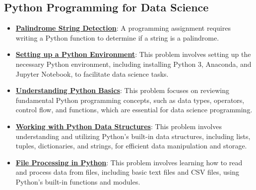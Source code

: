 \documentclass{article}%
\begin{document}
\subsection{Python Programming for Data Science}%
\label{subsec:PythonProgrammingforDataScience}%
\begin{itemize}[leftmargin=*]%
\item \href{https://purdue.brightspace.com/d2l/common/assets/pdfjs-d2l-dist/1.0.14-legacy/web/viewer.html?file=\%2Fcontent\%2Fenforced\%2F1095465-WL.202510.CS24200.LE1\%2F01L1-introduction.pdf\%3Fou\%3D1095465\&lang=en-us\&container=d2l-fileviewer-rendered-pdf\&fullscreen=d2l-fileviewer-rendered-pdf-dialog\&height=667#page=18}{\textbf{Palindrome String Detection}}: A programming assignment requires writing a Python function to determine if a string is a palindrome.%
\item \href{https://purdue.brightspace.com/d2l/common/assets/pdfjs-d2l-dist/1.0.14-legacy/web/viewer.html?file=\%2Fcontent\%2Fenforced\%2F1095465-WL.202510.CS24200.LE1\%2F02L1-python.pdf\%3Fou\%3D1095465\&lang=en-us\&container=d2l-fileviewer-rendered-pdf\&fullscreen=d2l-fileviewer-rendered-pdf-dialog\&height=667#page=3}{\textbf{Setting up a Python Environment}}: This problem involves setting up the necessary Python environment, including installing Python 3, Anaconda, and Jupyter Notebook, to facilitate data science tasks.%
\item \href{https://purdue.brightspace.com/d2l/common/assets/pdfjs-d2l-dist/1.0.14-legacy/web/viewer.html?file=\%2Fcontent\%2Fenforced\%2F1095465-WL.202510.CS24200.LE1\%2F02L1-python.pdf\%3Fou\%3D1095465\&lang=en-us\&container=d2l-fileviewer-rendered-pdf\&fullscreen=d2l-fileviewer-rendered-pdf-dialog\&height=667#page=6}{\textbf{Understanding Python Basics}}: This problem focuses on reviewing fundamental Python programming concepts, such as data types, operators, control flow, and functions, which are essential for data science programming.%
\item \href{https://purdue.brightspace.com/d2l/common/assets/pdfjs-d2l-dist/1.0.14-legacy/web/viewer.html?file=\%2Fcontent\%2Fenforced\%2F1095465-WL.202510.CS24200.LE1\%2F02L1-python.pdf\%3Fou\%3D1095465\&lang=en-us\&container=d2l-fileviewer-rendered-pdf\&fullscreen=d2l-fileviewer-rendered-pdf-dialog\&height=667#page=17}{\textbf{Working with Python Data Structures}}: This problem involves understanding and utilizing Python's built-in data structures, including lists, tuples, dictionaries, and strings, for efficient data manipulation and storage.%
\item \href{https://purdue.brightspace.com/d2l/common/assets/pdfjs-d2l-dist/1.0.14-legacy/web/viewer.html?file=\%2Fcontent\%2Fenforced\%2F1095465-WL.202510.CS24200.LE1\%2F02L1-python.pdf\%3Fou\%3D1095465\&lang=en-us\&container=d2l-fileviewer-rendered-pdf\&fullscreen=d2l-fileviewer-rendered-pdf-dialog\&height=667#page=46}{\textbf{File Processing in Python}}: This problem involves learning how to read and process data from files, including basic text files and CSV files, using Python's built-in functions and modules.%

\end{itemize}
\end{document}
